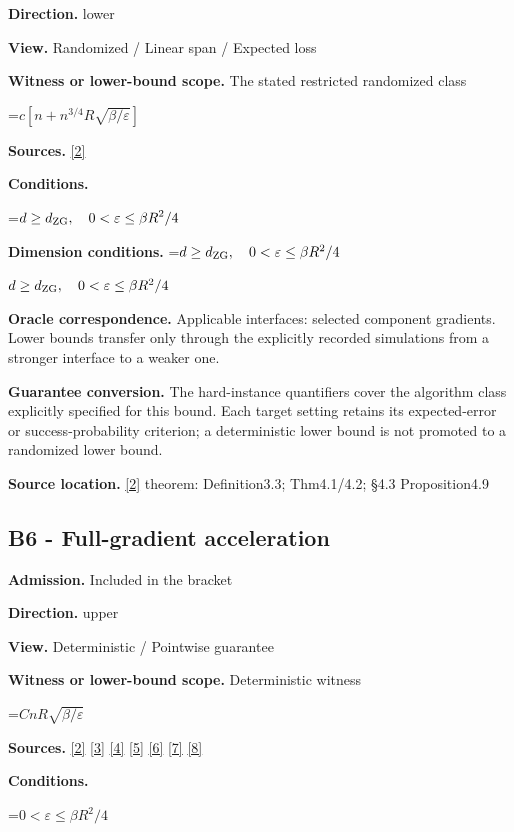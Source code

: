 \documentclass[10pt,a4paper]{article}
\newcommand{\AtlasMath}[1]{\par\begingroup\centering\setbox0=\hbox{$\displaystyle #1$}\ifdim\wd0>1.4\linewidth\typeout{ATLAS WIDE FORMULA: \the\wd0}\fi\ifdim\wd0>\linewidth\resizebox{\linewidth}{!}{\box0}\else\box0\fi\par\endgroup}
\newcommand{\AtlasInlineMath}[1]{\begingroup\setbox0=\hbox{$#1$}\ifdim\wd0>.4\linewidth\endgroup\AtlasMath{#1}\else\endgroup$#1$\fi}
\begin{document}
\textbf{Direction.} lower

\textbf{View.} Randomized / Linear span / Expected loss

\textbf{Witness or lower-bound scope.} The stated restricted randomized class

\AtlasMath{c[n+n^{3/4}R\sqrt{\beta/\varepsilon}]}
\textbf{Sources.} \href{https://proceedings.mlr.press/v97/zhou19b/zhou19b.pdf}{[2]}

\textbf{Conditions.} 
\AtlasMath{d\ge d_{\rm ZG},\quad0<\varepsilon\le\beta R^2/4}


\textbf{Dimension conditions.} \AtlasInlineMath{d\ge d_{\rm ZG},\quad0<\varepsilon\le\beta R^2/4}

\textbf{Oracle correspondence.} Applicable interfaces: selected component gradients. Lower bounds transfer only through the explicitly recorded simulations from a stronger interface to a weaker one.

\textbf{Guarantee conversion.} The hard-instance quantifiers cover the algorithm class explicitly specified for this bound. Each target setting retains its expected-error or success-probability criterion; a deterministic lower bound is not promoted to a randomized lower bound.

\textbf{Source location.} \href{https://proceedings.mlr.press/v97/zhou19b/zhou19b.pdf}{[2]} theorem: Definition3.3; Thm4.1/4.2; §4.3 Proposition4.9

\subsection{B6 - Full-gradient acceleration}
\textbf{Admission.} Included in the bracket

\textbf{Direction.} upper

\textbf{View.} Deterministic / Pointwise guarantee

\textbf{Witness or lower-bound scope.} Deterministic witness

\AtlasMath{CnR\sqrt{\beta/\varepsilon}}
\textbf{Sources.} \href{https://proceedings.mlr.press/v97/zhou19b/zhou19b.pdf}{[2]} \href{https://arxiv.org/pdf/1405.4980}{[3]} \href{https://arxiv.org/pdf/2101.09740v2}{[4]} \href{https://arxiv.org/pdf/2609.33360v2}{[5]} \href{https://arxiv.org/pdf/2609.10874}{[6]} \href{https://www2.isye.gatech.edu/~nemirovs/MOR_AccuracyCertificates.pdf}{[7]} \href{https://arxiv.org/pdf/2609.20701}{[8]}

\textbf{Conditions.} 
\AtlasMath{0<\varepsilon\le\beta R^2/4}
\end{document}

